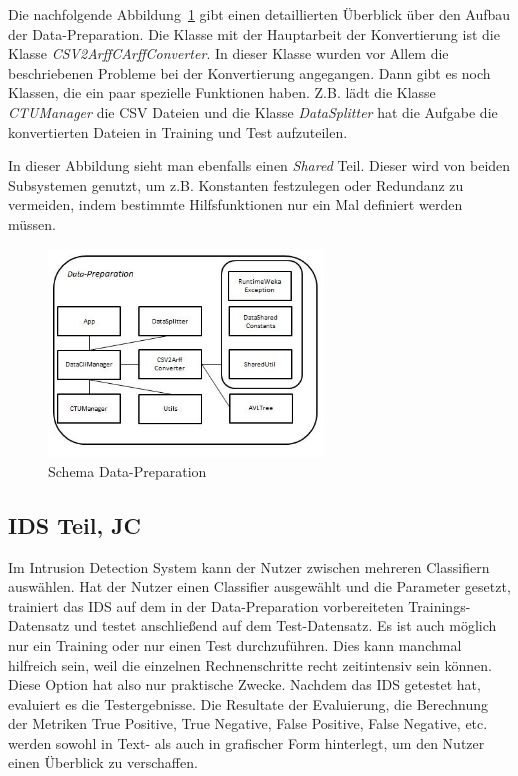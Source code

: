 \documentclass[main.tex]{subfiles}
\begin{document}
Die nachfolgende Abbildung~\ref{fig:schema_data_preparation} gibt einen detaillierten Überblick über den Aufbau der Data-Preparation.
Die Klasse mit der Hauptarbeit der Konvertierung ist die Klasse
\textit{CSV2ArffCArffConverter}.
In dieser Klasse wurden vor Allem die beschriebenen Probleme bei der
Konvertierung angegangen.
Dann gibt es noch Klassen, die ein paar spezielle Funktionen haben. Z.B. lädt
die Klasse \textit{CTUManager} die CSV Dateien und die Klasse
\textit{DataSplitter} hat die Aufgabe die konvertierten Dateien in Training und
Test aufzuteilen.

In dieser Abbildung sieht man ebenfalls einen \textit{Shared} Teil.
Dieser wird von beiden Subsystemen genutzt, um z.B. Konstanten festzulegen oder
Redundanz zu vermeiden, indem bestimmte Hilfsfunktionen nur ein Mal definiert
werden müssen.

\begin{figure}[ht]
 \centering
 \includegraphics[width=0.65\textwidth]{images/Schema_Data_Preparation.jpg}
 \caption{Schema Data-Preparation}
 \label{fig:schema_data_preparation}
\end{figure}


\subsection{IDS Teil, JC} \label{subsec:VorgehenIDS}

Im Intrusion Detection System kann der Nutzer zwischen mehreren Classifiern auswählen.
Hat der Nutzer einen Classifier ausgewählt und die Parameter gesetzt, trainiert das IDS auf dem in der Data-Preparation vorbereiteten Trainings-Datensatz und testet anschließend auf dem Test-Datensatz.
Es ist auch möglich nur ein Training oder nur einen Test durchzuführen.
Dies kann manchmal hilfreich sein, weil die einzelnen Rechnenschritte recht
zeitintensiv sein können.
Diese Option hat also nur praktische Zwecke.
Nachdem das IDS getestet hat, evaluiert es die Testergebnisse.
Die Resultate der Evaluierung, die Berechnung der Metriken True Positive, True
Negative, False Positive, False Negative, etc. werden sowohl in Text- als auch in
grafischer Form hinterlegt, um den Nutzer einen Überblick zu verschaffen.
\end{document}
